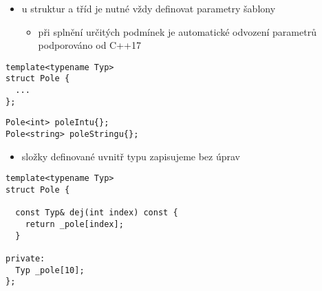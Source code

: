 


\begin{frame}[fragile]
\begin{block}{}
\begin{itemize}
\item u struktur a tříd je nutné vždy definovat parametry šablony
\begin{itemize}
\item při splnění určitých podmínek je automatické odvození parametrů podporováno od C++17
\end{itemize}
\end{itemize}
\end{block}

\begin{yesblock}
\begin{lstlisting}
template<typename Typ>
struct Pole {
  ...
};
\end{lstlisting}
\end{yesblock}

\begin{yesblock}
\begin{lstlisting}
Pole<int> poleIntu{};
Pole<string> poleStringu{};
\end{lstlisting}
\end{yesblock}

\end{frame}








\begin{frame}[fragile]
\begin{block}{}
\begin{itemize}
\item složky definované uvnitř typu zapisujeme bez úprav
\end{itemize}
\end{block}

\begin{yesblock}
\begin{lstlisting}
template<typename Typ>
struct Pole {
  
  const Typ& dej(int index) const {
    return _pole[index];
  }

private:
  Typ _pole[10];
};
\end{lstlisting}
\end{yesblock}

\end{frame}







